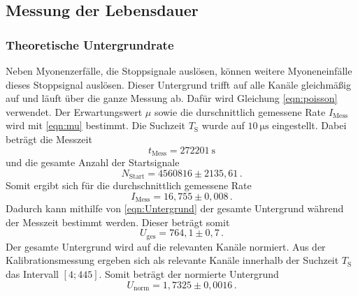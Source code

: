 \subsection{Messung der Lebensdauer}
  \subsubsection{Theoretische Untergrundrate}
    Neben Myonenzerfälle, die Stoppsignale auslösen, können weitere Myoneneinfälle dieses Stoppsignal auslösen.
    Dieser Untergrund trifft auf alle Kanäle gleichmäßig auf und läuft über die ganze Messung ab.
    Dafür wird Gleichung \eqref{eqn:poisson} verwendet.
    Der Erwartungswert $\mu$ sowie die durschnittlich gemessene Rate $I_\text{Mess}$ wird mit \eqref{eqn:mu} bestimmt.
    Die Suchzeit $T_\text{S}$ wurde auf $\SI{10}{\micro\second}$ eingestellt.
    Dabei beträgt die Messzeit
    \begin{equation*}
      t_\text{Mess} = \SI{272201}{\second}
    \end{equation*}
    und die gesamte Anzahl der Startsignale
    \begin{equation*}
      N_\text{Start} = 4560816 \pm 2135,61 \, .
    \end{equation*}
    Somit ergibt sich für die durchschnittlich gemessene Rate
    \begin{equation*}
      I_\text{Mess} = 16,755 \pm 0,008 \, .
    \end{equation*}
    Dadurch kann mithilfe von \eqref{eqn:Untergrund} der gesamte Untergrund während der Messzeit bestimmt werden.
    Dieser beträgt somit
    \begin{equation*}
      U_\text{ges} = 764,1 \pm 0,7 \,.
    \end{equation*}
    Der gesamte Untergrund wird auf die relevanten Kanäle normiert.
    Aus der Kalibrationsmessung ergeben sich als relevante Kanäle innerhalb der Suchzeit $T_\text{S}$ das Intervall $[4;445]$.
    Somit beträgt der normierte Untergrund
    \begin{equation*}
      U_\text{norm} = 1,7325 \pm 0,0016 \, .
    \end{equation*}
  
